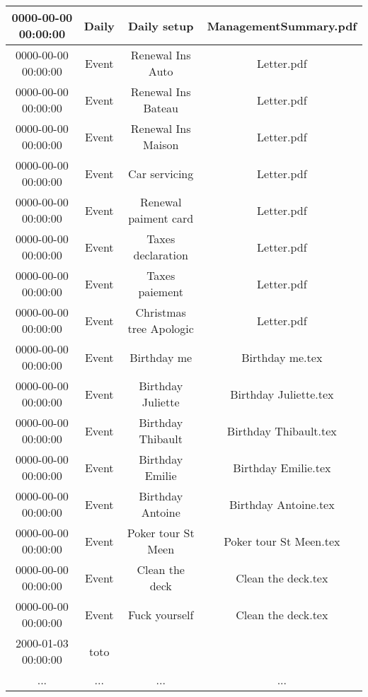 \begin{longtable}{|c|c|c|c|}
\hline
0000-00-00 00:00:00 & Daily & Daily setup & ManagementSummary.pdf\\
\hline
0000-00-00 00:00:00 & Event & Renewal Ins Auto & Letter.pdf\\
\hline
0000-00-00 00:00:00 & Event & Renewal Ins Bateau & Letter.pdf\\
\hline
0000-00-00 00:00:00 & Event & Renewal Ins Maison & Letter.pdf\\
\hline
0000-00-00 00:00:00 & Event & Car servicing & Letter.pdf\\
\hline
0000-00-00 00:00:00 & Event & Renewal paiment card & Letter.pdf\\
\hline
0000-00-00 00:00:00 & Event & Taxes declaration & Letter.pdf\\
\hline
0000-00-00 00:00:00 & Event & Taxes paiement & Letter.pdf\\
\hline
0000-00-00 00:00:00 & Event & Christmas tree Apologic & Letter.pdf\\
\hline
0000-00-00 00:00:00 & Event & Birthday me & Birthday me.tex\\
\hline
0000-00-00 00:00:00 & Event & Birthday Juliette & Birthday Juliette.tex\\
\hline
0000-00-00 00:00:00 & Event & Birthday Thibault & Birthday Thibault.tex\\
\hline
0000-00-00 00:00:00 & Event & Birthday Emilie & Birthday Emilie.tex\\
\hline
0000-00-00 00:00:00 & Event & Birthday Antoine & Birthday Antoine.tex\\
\hline
0000-00-00 00:00:00 & Event & Poker tour St Meen & Poker tour St Meen.tex\\
\hline
0000-00-00 00:00:00 & Event & Clean the deck & Clean the deck.tex\\
\hline
0000-00-00 00:00:00 & Event & Fuck yourself & Clean the deck.tex\\
\hline
2000-01-03 00:00:00 & toto &  & \\
\hline
 ... & ... & ... & ... \\
\hline
\hline
\end{longtable}

